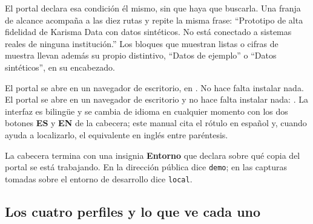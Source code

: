 El portal declara esa condición él mismo, sin que haya que buscarla. Una franja de alcance
acompaña a las diez rutas y repite la misma frase: \enquote{Prototipo de alta fidelidad de
Karisma Data con datos sintéticos. No está conectado a sistemas reales de ninguna institución.}
Los bloques que muestran listas o cifras de muestra llevan además su propio distintivo,
\enquote{Datos de ejemplo} o \enquote{Datos sintéticos}, en su encabezado.

\siHayDemoWeb
  {El portal se abre en un navegador de escritorio, en \urlDemoWeb. No hace falta instalar nada.}
  {El portal se abre en un navegador de escritorio y no hace falta instalar nada:
   \urlDemoWeb.}
La interfaz es bilingüe y se cambia de idioma en cualquier momento con los dos botones
\textbf{ES} y \textbf{EN} de la cabecera; este manual cita el rótulo en español y, cuando ayuda a
localizarlo, el equivalente en inglés entre paréntesis.

\begin{uxlist}
\end{uxlist}

La cabecera termina con una insignia \textbf{Entorno} que declara sobre qué copia del portal se
está trabajando. En la dirección pública dice \texttt{demo}; en las capturas tomadas sobre el
entorno de desarrollo dice \texttt{local}.

\subsection{Los cuatro perfiles y lo que ve cada uno}

